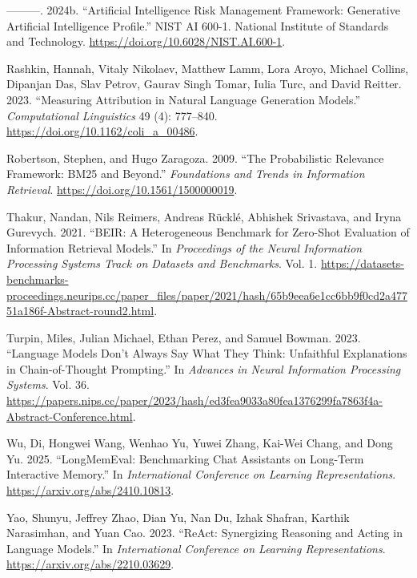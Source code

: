 \documentclass[
  11pt,
]{article}
\newlength{\cslhangindent}
\newenvironment{CSLReferences}[2] %
 {\begin{list}{}{%
  \setlength{\itemindent}{0pt}
  \setlength{\leftmargin}{0pt}
  \setlength{\parsep}{0pt}
  \ifodd #1
   \setlength{\leftmargin}{\cslhangindent}
   \setlength{\itemindent}{-1\cslhangindent}
  \fi
  \setlength{\itemsep}{#2\baselineskip}}}
 {\end{list}}
\begin{document}
\begin{CSLReferences}{1}{0}
---------. 2024b. {``Artificial Intelligence Risk Management Framework:
Generative Artificial Intelligence Profile.''} NIST AI 600-1. National
Institute of Standards and Technology.
\url{https://doi.org/10.6028/NIST.AI.600-1}.

Rashkin, Hannah, Vitaly Nikolaev, Matthew Lamm, Lora Aroyo, Michael
Collins, Dipanjan Das, Slav Petrov, Gaurav Singh Tomar, Iulia Turc, and
David Reitter. 2023. {``Measuring Attribution in Natural Language
Generation Models.''} \emph{Computational Linguistics} 49 (4): 777--840.
\url{https://doi.org/10.1162/coli_a_00486}.

Robertson, Stephen, and Hugo Zaragoza. 2009. {``The Probabilistic
Relevance Framework: BM25 and Beyond.''} \emph{Foundations and Trends in
Information Retrieval}. \url{https://doi.org/10.1561/1500000019}.

Thakur, Nandan, Nils Reimers, Andreas Rücklé, Abhishek Srivastava, and
Iryna Gurevych. 2021. {``BEIR: A Heterogeneous Benchmark for Zero-Shot
Evaluation of Information Retrieval Models.''} In \emph{Proceedings of
the Neural Information Processing Systems Track on Datasets and
Benchmarks}. Vol. 1.
\url{https://datasets-benchmarks-proceedings.neurips.cc/paper_files/paper/2021/hash/65b9eea6e1cc6bb9f0cd2a47751a186f-Abstract-round2.html}.

Turpin, Miles, Julian Michael, Ethan Perez, and Samuel Bowman. 2023.
{``Language Models Don't Always Say What They Think: Unfaithful
Explanations in Chain-of-Thought Prompting.''} In \emph{Advances in
Neural Information Processing Systems}. Vol. 36.
\url{https://papers.nips.cc/paper/2023/hash/ed3fea9033a80fea1376299fa7863f4a-Abstract-Conference.html}.

Wu, Di, Hongwei Wang, Wenhao Yu, Yuwei Zhang, Kai-Wei Chang, and Dong
Yu. 2025. {``LongMemEval: Benchmarking Chat Assistants on Long-Term
Interactive Memory.''} In \emph{International Conference on Learning
Representations}. \url{https://arxiv.org/abs/2410.10813}.

Yao, Shunyu, Jeffrey Zhao, Dian Yu, Nan Du, Izhak Shafran, Karthik
Narasimhan, and Yuan Cao. 2023. {``ReAct: Synergizing Reasoning and
Acting in Language Models.''} In \emph{International Conference on
Learning Representations}. \url{https://arxiv.org/abs/2210.03629}.

\end{CSLReferences}
\end{document}
